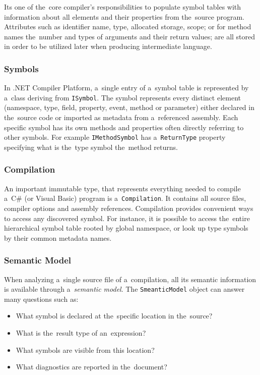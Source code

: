 \documentclass[
  digital, %
  table,   %
  lof,     %
  lot,     %
  oneside,
]{fithesis3}
\begin{document}
Its one of the~core compiler's responsibilities to populate symbol tables with information about all elements and their properties from the~source program. Attributes such as identifier name, type, allocated storage, scope; or for method names the~number and types of arguments and their return values; are all stored in order to be utilized later when producing intermediate language.

\subsubsection{Symbols}
In .NET Compiler Platform, a~single entry of a~symbol table is represented by a~class deriving from \texttt{ISymbol}. The symbol represents every distinct element (namespace, type, field, property, event, method or parameter) either declared in the~source code or imported as metadata from a~referenced assembly. Each specific symbol has its own methods and properties often directly referring to other symbols. For example \texttt{IMethodSymbol} has a~\texttt{ReturnType} property specifying what is the~type symbol the~method returns.

\subsubsection{Compilation}
An important immutable type, that represents everything needed to compile a~C\# (or Visual Basic) program is a~\texttt{Compilation}. It contains all source files, compiler options and assembly references. Compilation provides convenient ways to access any discovered symbol. For instance, it is possible to access the~entire hierarchical symbol table rooted by global namespace, or look up type symbols by their common metadata names.

\subsubsection{Semantic Model}
When analyzing a~single source file of a~compilation, all its semantic information is available through a~\textit{semantic model}. The \texttt{SmeanticModel} object can answer many questions such as:
  \begin{itemize}
  \item What symbol is declared at the~specific location in the~source?
  \item What is the~result type of an~expression?
  \item What symbols are visible from this location?
  \item What diagnostics are reported in the~document?
  \end{itemize}
 
\end{document}
